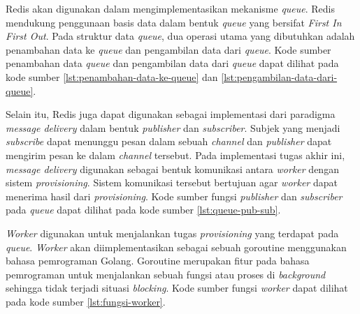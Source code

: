 Redis akan digunakan dalam mengimplementasikan mekanisme \emph{queue}. Redis mendukung
penggunaan basis data dalam bentuk \emph{queue} yang bersifat \emph{First In First Out}.
Pada struktur data \emph{queue}, dua operasi utama yang dibutuhkan adalah penambahan data
ke \emph{queue} dan pengambilan data dari \emph{queue}. Kode sumber penambahan data \emph{queue}
dan pengambilan data dari \emph{queue} dapat dilihat pada kode sumber
\ref{lst:penambahan-data-ke-queue} dan \ref{lst:pengambilan-data-dari-queue}.





Selain itu, Redis juga dapat digunakan sebagai implementasi dari paradigma \emph{message delivery}
dalam bentuk \emph{publisher} dan \emph{subscriber}. Subjek yang menjadi
\emph{subscribe} dapat menunggu pesan dalam sebuah \emph{channel} dan 
\emph{publisher} dapat mengirim pesan ke dalam \emph{channel} tersebut.
Pada implementasi tugas akhir ini, \emph{message delivery} digunakan
sebagai bentuk komunikasi antara \emph{worker} dengan sistem \emph{provisioning}.
Sistem komunikasi tersebut bertujuan agar \emph{worker} dapat menerima hasil
dari \emph{provisioning}. Kode sumber fungsi \emph{publisher} dan \emph{subscriber}
pada \emph{queue} dapat dilihat pada kode sumber \ref{lst:queue-pub-sub}.



\emph{Worker} digunakan untuk menjalankan tugas \emph{provisioning}
yang terdapat pada \emph{queue}. \emph{Worker} akan diimplementasikan
sebagai sebuah goroutine menggunakan bahasa pemrograman Golang. Goroutine merupakan
fitur pada bahasa pemrograman untuk menjalankan sebuah fungsi atau proses
di \emph{background} sehingga tidak terjadi situasi \emph{blocking}. Kode sumber
fungsi \emph{worker} dapat dilihat pada kode sumber \ref{lst:fungsi-worker}.

\clearpage



